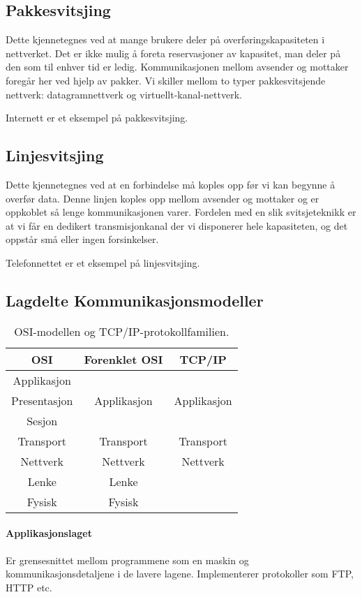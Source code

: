 \documentclass[11pt,a4paper]{article}
\begin{document}
\subsection{Pakkesvitsjing}
Dette kjennetegnes ved at mange brukere deler på overføringskapasiteten i nettverket. Det er ikke mulig å foreta reservasjoner av kapasitet, man deler på den som til enhver tid er ledig. Kommunikasjonen mellom avsender og mottaker foregår her ved hjelp av pakker. Vi skiller mellom to typer pakkesvitsjende nettverk: datagramnettverk og virtuellt-kanal-nettverk.

Internett er et eksempel på pakkesvitsjing.

\subsection{Linjesvitsjing}
Dette kjennetegnes ved at en forbindelse må koples opp før vi kan begynne å overfør data. Denne linjen koples opp mellom avsender og mottaker og er oppkoblet så lenge kommunikasjonen varer. Fordelen med en slik svitsjeteknikk er at vi får en dedikert transmisjonkanal der vi disponerer hele kapasiteten, og det oppstår små eller ingen forsinkelser. 

Telefonnettet er et eksempel på linjesvitsjing.

\subsection{Lagdelte Kommunikasjonsmodeller}
\begin{table}[h!]
	\begin{center}
		\begin{tabular}{| c | c | c |}
		\hline
		\textbf{OSI} & \textbf{Forenklet OSI} & \textbf{TCP/IP}\\
		\hline
		Applikasjon & & \\
		Presentasjon & Applikasjon & Applikasjon\\
		Sesjon & & \\
		Transport & Transport & Transport\\
		Nettverk & Nettverk & Nettverk\\
		Lenke & Lenke & \\
		Fysisk & Fysisk & \\
		\hline
		\end{tabular}
	\end{center}
	\caption{OSI-modellen og TCP/IP-protokollfamilien.}
\end{table}

\paragraph{Applikasjonslaget} 
Er grensesnittet mellom programmene som en maskin og kommunikasjonsdetaljene i de lavere lagene. Implementerer protokoller som FTP, HTTP etc.
\end{document}
